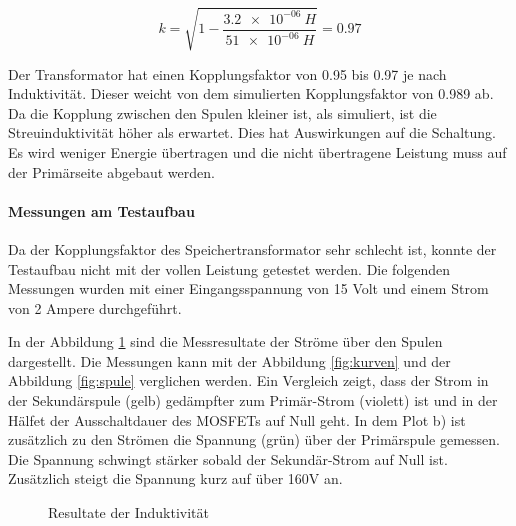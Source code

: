 \begin{equation}\label{eq:berechnung_k2}
k = \sqrt{1-\frac{\SI{3.2e-06}{H}}{\SI{51e-06}{H}}}=0.97
\end{equation}

Der Transformator hat einen Kopplungsfaktor von 0.95 bis 0.97 je nach Induktivität. Dieser weicht von dem simulierten Kopplungsfaktor von 0.989 ab. Da die Kopplung zwischen den Spulen kleiner ist, als simuliert, ist die Streuinduktivität höher als erwartet. Dies hat Auswirkungen auf die Schaltung. Es wird weniger Energie übertragen und die nicht übertragene Leistung muss auf der Primärseite abgebaut werden.  

\paragraph{Messungen am Testaufbau}
Da der Kopplungsfaktor des Speichertransformator sehr schlecht ist, konnte der Testaufbau nicht mit der vollen Leistung getestet werden. Die folgenden Messungen wurden mit einer Eingangsspannung von 15 Volt und einem Strom von 2 Ampere durchgeführt.   

In der Abbildung \ref{fig:mess_ströme} sind die Messresultate der Ströme über den Spulen dargestellt. Die Messungen kann mit der Abbildung \ref{fig:kurven} und der Abbildung \ref{fig:spule} verglichen werden. Ein Vergleich zeigt, dass der Strom in der Sekundärspule (gelb) gedämpfter zum Primär-Strom (violett) ist und in der Hälfet der Ausschaltdauer des MOSFETs auf Null geht. In dem Plot b) ist zusätzlich zu den Strömen die Spannung (grün) über der Primärspule gemessen. Die Spannung schwingt stärker sobald der Sekundär-Strom auf Null ist. Zusätzlich steigt die Spannung kurz auf über 160V an. 

\begin{figure}[H]
	\centering
	\qquad
	\caption{Resultate der Induktivität}
	\label{fig:mess_ströme}
\end{figure}
